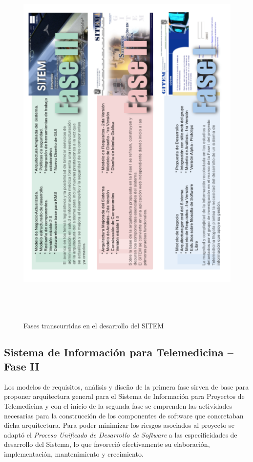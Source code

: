 \begin{figure}
 \centering
 \includegraphics[width=142mm, height=190mm]{fase_sitem.png}
 \caption{Fases transcurridas en el desarrollo del SITEM}
 \label{fase_sitem}
\end{figure}

\subsection{Sistema de Información para Telemedicina – Fase II}

Los modelos de requisitos, análisis y diseño de la primera fase sirven de base para proponer arquitectura general para el Sistema de Información para Proyectos de Telemedicina y con el inicio de la segunda fase se emprenden las actividades necesarias para la construcción de los componentes de software que concretaban dicha arquitectura. Para poder minimizar los riesgos asociados al proyecto se adaptó el \textit{Proceso Unificado de Desarrollo de Software} a las especificidades de desarrollo del Sistema, lo que favoreció efectivamente su elaboración, implementación, mantenimiento y crecimiento.

